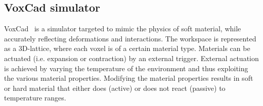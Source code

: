 \documentclass{sig-alternate}
\begin{document}

\subsection{VoxCad simulator}
VoxCad~\cite{hiller2012dynamic} is a simulator targeted to mimic the physics of soft material, while accurately reflecting deformations and interactions. The workspace is represented as a 3D-lattice, where each voxel is of a certain material type. Materials can be actuated (i.e. expansion or contraction) by an external trigger. External actuation is achieved by varying the temperature of the environment and thus exploiting the various material properties. Modifying the material properties results in soft or hard material that either does (active) or does not  react (passive) to temperature ranges.
\end{document}
